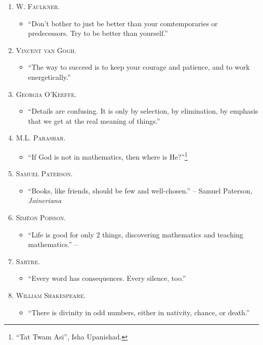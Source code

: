 \documentclass{article}
\numberwithin{equation}{section}
\begin{document}
\begin{enumerate}
	\item \textsc{W. Faulkner.}
	\begin{itemize}
		\item ``Don't bother to just be better than your comtemporaries or predecessors. Try to be better than yourself.''
	\end{itemize}
	\item \textsc{Vincent van Gogh.}
	\begin{itemize}
		\item ``The way to succeed is to keep your courage and patience, and to work energetically.''
	\end{itemize}	
	\item \textsc{Georgia O'Keeffe.}
	\begin{itemize}
		\item ``Details are confusing. It is only by selection, by elimination, by emphasis that we get at the real meaning of things.''
	\end{itemize}
	\item \textsc{M.L. Parashar.}
	\begin{itemize}
		\item ``If God is not in mathematics, then where is He?''\footnote{``Tat Twam Asi'', Isha Upanishad.}
	\end{itemize}
	\item \textsc{Samuel Paterson.}
	\begin{itemize}
		\item ``Books, like friends, should be few and well-chosen.'' -- Samuel Paterson, \textit{Joineriana}
	\end{itemize}
	\item \textsc{Sim\'eon Poisson.}
	\begin{itemize}
		\item ``Life is good for only 2 things, discovering mathematics and teaching mathematics.'' -- \cite[p. v]{Gelca_Andreescu2017}
	\end{itemize}
	\item \textsc{Sartre.}
	\begin{itemize}
		\item ``Every word has consequences. Every silence, too.''
	\end{itemize}	
	\item \textsc{William Shakespeare.}
	\begin{itemize}
		\item ``There is divinity in odd numbers, either in nativity, chance, or death.''
	\end{itemize}	

\end{enumerate}
\end{document}
